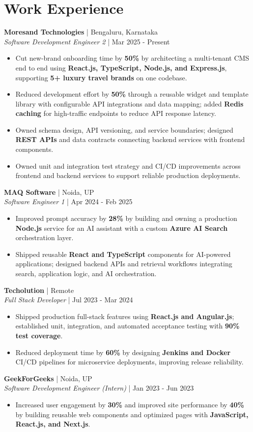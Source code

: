 \documentclass[a4paper,10pt]{article}
\newcommand{\role}[4]{\textbf{#1} | #2\\\textit{#3} | #4\par}
\begin{document}
\section{Work Experience}
\role{Moresand Technologies}{Bengaluru, Karnataka}{Software Development Engineer 2}{Mar 2025 - Present}
\begin{itemize}
\item Cut new-brand onboarding time by \textbf{50\%} by architecting a multi-tenant CMS end to end using \textbf{React.js, TypeScript, Node.js, and Express.js}, supporting \textbf{5+ luxury travel brands} on one codebase.
\item Reduced development effort by \textbf{50\%} through a reusable widget and template library with configurable API integrations and data mapping; added \textbf{Redis caching} for high-traffic endpoints to reduce API response latency.
\item Owned schema design, API versioning, and service boundaries; designed \textbf{REST APIs} and data contracts connecting backend services with frontend components.
\item Owned unit and integration test strategy and CI/CD improvements across frontend and backend services to support reliable production deployments.
\end{itemize}
\role{MAQ Software}{Noida, UP}{Software Engineer 1}{Apr 2024 - Feb 2025}
\begin{itemize}
\item Improved prompt accuracy by \textbf{28\%} by building and owning a production \textbf{Node.js} service for an AI assistant with a custom \textbf{Azure AI Search} orchestration layer.
\item Shipped reusable \textbf{React and TypeScript} components for AI-powered applications; designed backend APIs and retrieval workflows integrating search, application logic, and AI orchestration.
\end{itemize}
\role{Techolution}{Remote}{Full Stack Developer}{Jul 2023 - Mar 2024}
\begin{itemize}
\item Shipped production full-stack features using \textbf{React.js and Angular.js}; established unit, integration, and automated acceptance testing with \textbf{90\% test coverage}.
\item Reduced deployment time by \textbf{60\%} by designing \textbf{Jenkins and Docker} CI/CD pipelines for microservice deployments, improving release reliability.
\end{itemize}
\role{GeekForGeeks}{Noida, UP}{Software Development Engineer (Intern)}{Jan 2023 - Jun 2023}
\begin{itemize}
\item Increased user engagement by \textbf{30\%} and improved site performance by \textbf{40\%} by building reusable web components and optimized pages with \textbf{JavaScript, React.js, and Next.js}.
\end{itemize}
\end{document}
